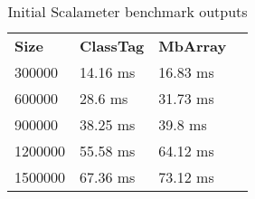 \begin{table}[t]
  \begin{tabularx}{0.48\textwidth}{|g *{3}{|Y}|} \hline
    \textbf{Size} & \textbf{ClassTag} & \textbf{MbArray} \\
    300000		&              14.16 ms &              16.83 ms \\
    600000		&              28.6 ms 	&              31.73 ms \\
    900000      &              38.25 ms &              39.8 ms \\
    1200000     &              55.58 ms &              64.12 ms \\ 
    1500000     &              67.36 ms &              73.12 ms \\ \hline
  \end{tabularx}
  \vspace{-2mm}
  \caption{Initial Scalameter benchmark outputs}
  \label{table:InitCTvsMB}
  \vspace{-1em}
\end{table}